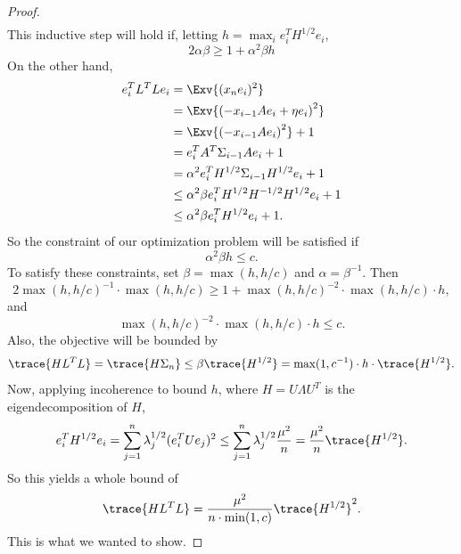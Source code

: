 \begin{toappendix}
\begin{proof}
\begin{align*}
\end{align*}
This inductive step will hold if, letting $h = \max_i e_i^T H^{1/2} e_i$,
\[
	2 \alpha \beta \ge 1 + \alpha^2 \beta h
\]
On the other hand,
\begin{align*}
	e_i^T L^T L e_i 
	&= \Exv{(x_n e_i)^2} 
	\\&=  \Exv{\left( -x_{i-1} A e_i + \eta e_i \right)^2}
	\\&=  \Exv{\left( -x_{i-1} A e_i \right)^2} + 1
	\\&= e_i^T A^T \Sigma_{i-1} A e_i + 1
	\\&= \alpha^2 e_i^T H^{1/2} \Sigma_{i-1} H^{1/2} e_i + 1
	\\&\le \alpha^2 \beta e_i^T H^{1/2} H^{-1/2} H^{1/2} e_i + 1
	\\&\le \alpha^2 \beta e_i^T H^{1/2} e_i + 1.
\end{align*}
So the constraint of our optimization problem will be satisfied if
\[
	\alpha^2 \beta h \le c.
\]
To satisfy these constraints, set $\beta = \max(h, h/c)$ and $\alpha = \beta^{-1}$. Then
\[
	2 \max(h, h/c)^{-1} \cdot \max(h, h/c) \ge 1 + \max(h, h/c)^{-2} \cdot \max(h, h/c) \cdot h,
\]
and
\[
	\max(h, h/c)^{-2} \cdot \max(h, h/c) \cdot h \le c.
\]
Also, the objective will be bounded by
\[
	\trace{H L^T L} = \trace{H \Sigma_n} \le \beta \trace{H^{1/2}} = \max(1, c^{-1}) \cdot h \cdot \trace{H^{1/2}}.
\]
Now, applying incoherence to bound $h$, where $H = U \Lambda U^T$ is the eigendecomposition of $H$,
\[
	e_i^T H^{1/2} e_i 
	= 
	\sum_{j=1}^n \lambda_j^{1/2} (e_i^T U e_j)^2
	\le
	\sum_{j=1}^n \lambda_j^{1/2} \frac{\mu^2}{n}
	=
	\frac{\mu^2}{n} \trace{H^{1/2}}.
\]
So this yields a whole bound of
\[
	\trace{H L^T L} = \frac{\mu^2}{n \cdot \min(1,c)} \trace{H^{1/2}}^2.
\]
This is what we wanted to show.
\end{proof}


\end{toappendix}
